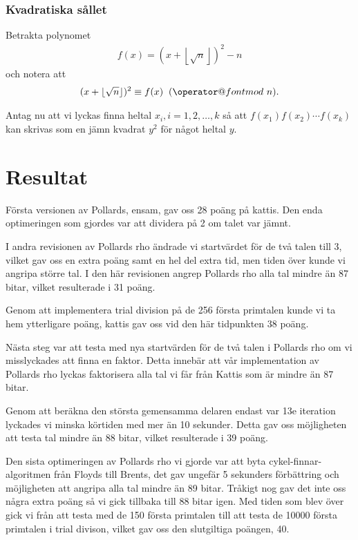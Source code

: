 \documentclass[a4paper,12pt]{article}
\makeatletter
\def\imod#1{\allowbreak\mkern10mu({\operator@font mod}\,\,#1)}
\renewcommand{\*}{\ensuremath{\cdot}}
\makeatother
\begin{document}
\subsubsection{Kvadratiska sållet}

Betrakta polynomet 
\begin{align*}
    f(x) = (x + \left\lfloor \sqrt{n} \right\rfloor)^2 - n
\end{align*}
och notera att
\begin{align*}
    (x + \lfloor \sqrt{n} \rfloor)^2 \equiv f(x) \imod{n}.
\end{align*}

Antag nu att vi lyckas finna heltal $x_i, i = 1, 2, \dots, k$ så att
$f(x_1)f(x_2)\cdots f(x_k)$ kan skrivas som en jämn kvadrat $y^2$ för något
heltal $y$.






\section{Resultat}

Första versionen av Pollards, ensam, gav oss 28 poäng på kattis. Den enda optimeringen som gjordes var att dividera på 2 om talet var jämnt.

I andra revisionen av Pollards rho ändrade vi startvärdet för de två talen till 3, vilket gav oss en extra poäng samt en hel del extra tid, men tiden över kunde vi angripa större tal. I den här revisionen angrep Pollards rho alla tal mindre än 87 bitar, vilket resulterade i 31 poäng.

Genom att implementera trial division på de 256 första primtalen kunde vi ta hem ytterligare poäng, kattis gav oss vid den här tidpunkten 38 poäng.

Nästa steg var att testa med nya startvärden för de två talen i Pollards rho om vi misslyckades att finna en faktor. Detta innebär att vår implementation av Pollards rho lyckas faktorisera alla tal vi får från Kattis som är mindre än 87 bitar.

Genom att beräkna den största gemensamma delaren endast var 13e iteration lyckades vi minska körtiden med mer än 10 sekunder. Detta gav oss möjligheten att testa tal mindre än 88 bitar, vilket resulterade i 39 poäng.

Den sista optimeringen av Pollards rho vi gjorde var att byta cykel-finnar-algoritmen från Floyds till Brents, det gav ungefär 5 sekunders förbättring och möjligheten att angripa alla tal mindre än 89 bitar. Tråkigt nog gav det inte oss några extra poäng så vi gick tillbaka till 88 bitar igen. Med tiden som blev över gick vi från att testa med de 150 första primtalen till att testa de 10000 första primtalen i trial divison, vilket gav oss den slutgiltiga poängen, 40.
\end{document}

